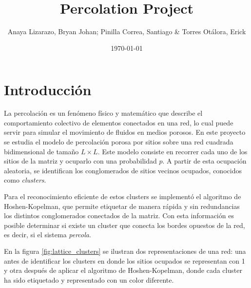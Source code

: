\documentclass{article}
\title{Percolation Project}
\author{Anaya Lizarazo, Bryan Johan; Pinilla Correa, Santiago \& Torres Otálora, Erick}
\date{\today}
\begin{document}
 

\maketitle

\section{Introducción} 

La percolación es un fenómeno físico y matemático que describe el comportamiento colectivo de elementos conectados en una red, lo cual puede servir para simular el movimiento de fluidos en medios porosos. En este proyecto se estudia el modelo de percolación porosa por sitios sobre una red cuadrada bidimensional de tamaño \( L \times L \). Este modelo consiste en recorrer cada uno de los sitios de la matriz y ocuparlo con una probabilidad \( p \). A partir de esta ocupación aleatoria, se identifican los conglomerados de sitios vecinos ocupados, conocidos como \emph{clusters}.

Para el reconocimiento eficiente de estos clusters se implementó el algoritmo de Hoshen-Kopelman, que permite etiquetar de manera rápida y sin redundancias los distintos conglomerados conectados de la matriz. Con esta información es posible determinar si existe un cluster que conecta los bordes opuestos de la red, es decir, si el sistema \emph{percola}.

En la figura \ref{fig:lattice_clusters} se ilustran dos representaciones de una red: una antes de identificar los clusters en donde los sitios ocupados se representan con 1 y otra después de aplicar el algoritmo de Hoshen-Kopelman, donde cada cluster ha sido etiquetado y representado con un color diferente.
\end{document}
